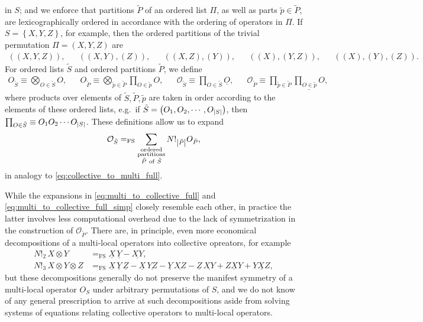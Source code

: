 \documentclass[nofootinbib,notitlepage,11pt]{revtex4-2}
\renewcommand{\t}{\text} %
\newcommand{\p}[1]{\left(#1\right)} %
\renewcommand{\set}[1]{\left\{#1\right\}} %
\newcommand{\1}{\mathds{1}}
\renewcommand{\O}{\mathcal{O}}
\newcommand{\EQFS}{=_{\text{FS}}}
\newcommand{\col}{\underline}
\begin{document}
in $S$; and we enforce that partitions $\tilde P$ of an ordered list
$\Pi$, as well as parts $\tilde p\in\tilde P$, are lexicographically
ordered in accordance with the ordering of operators in $\Pi$.  If
$S=\set{X,Y,Z}$, for example, then the ordered partitions of the
trivial permutation $\Pi=\p{X,Y,Z}$ are
\begin{align}
  \p{\p{X,Y,Z}}, &&
  \p{\p{X,Y},\p{Z}}, &&
  \p{\p{X,Z},\p{Y}}, &&
  \p{\p{X},\p{Y,Z}}, &&
  \p{\p{X},\p{Y},\p{Z}}.
\end{align}
For ordered lists $\tilde S$ and ordered partitions $\tilde P$, we
define
\begin{align}
  O_{\tilde S} \equiv \bigotimes_{O\in\tilde S} O,
  &&
  O_{\tilde P}
  \equiv \bigotimes_{\tilde p\in\tilde P} \prod_{O\in\tilde p} O,
  &&
  \O_{\tilde S} \equiv \prod_{O\in\tilde S} \col{O},
  &&
  \O_{\tilde P}
  \equiv \prod_{\tilde p\in\tilde P}
  \col{\textstyle\prod_{O\in\tilde p} O},
\end{align}
where products over elements of $\tilde S,\tilde P,\tilde p$ are taken
in order according to the elements of these ordered lists, e.g.~if
$\tilde S=\p{O_1,O_2,\cdots,O_{\abs{S}}}$, then
$\prod_{O\in\tilde S}\equiv O_1O_2\cdots O_{\abs{S}}$.  These
definitions allow us to expand
\begin{align}
  \O_{\tilde S} \EQFS
  \sum_{\substack{\t{ordered}\\\t{partitions}\\\tilde P~\t{of}~\tilde S}}
  N!_{\abs{\tilde P}} O_{\tilde P},
\end{align}
in analogy to \eqref{eq:collective_to_multi_full}.

While the expansions in \eqref{eq:multi_to_collective_full} and
\eqref{eq:multi_to_collective_full_simp} closely resemble each other,
in practice the latter involves less computational overhead due to the
lack of symmetrization in the construction of $\O_{\tilde P}$.  There
are, in principle, even more economical decompositions of a
multi-local operators into collective opreators, for example
\begin{align}
  N!_2\, X\otimes Y
  &\EQFS \col{X}\,\col{Y} - \col{XY}, \\
  N!_3\, X\otimes Y \otimes Z
  &\EQFS \col{X}\,\col{Y}\,\col{Z}
  - \col{X}\,\col{YZ} - \col{Y}\,\col{XZ} - \col{Z}\,\col{XY}
  + \col{ZXY} + \col{YXZ},
\end{align}
but these decompositions generally do not preserve the manifest
symmetry of a multi-local operator $O_S$ under arbitrary permutations
of $S$, and we do not know of any general prescription to arrive at
such decompositions aside from solving systems of equations relating
collective operators to multi-local operators.
\end{document}
